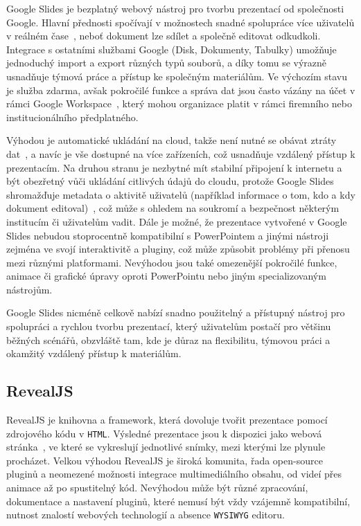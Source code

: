 Google Slides je bezplatný webový nástroj pro tvorbu prezentací od společnosti Google. 
Hlavní přednosti spočívají v možnostech snadné spolupráce více uživatelů v reálném čase~\cite{slides}, neboť dokument lze sdílet a společně editovat odkudkoli.
Integrace s ostatními službami Google (Disk, Dokumenty, Tabulky) umožňuje jednoduchý import a export různých typů souborů, a díky tomu se výrazně usnadňuje týmová práce a přístup ke společným materiálům. 
Ve výchozím stavu je služba zdarma, avšak pokročilé funkce a správa dat jsou často vázány na účet v rámci Google Workspace~\cite{slides}, který mohou organizace platit v rámci firemního nebo institucionálního předplatného. 

Výhodou je automatické ukládání na cloud, takže není nutné se obávat ztráty dat~\cite{slides}, a navíc je vše dostupné na více zařízeních, což usnadňuje vzdálený přístup k prezentacím. 
Na druhou stranu je nezbytné mít stabilní připojení k internetu a být obezřetný vůči ukládání citlivých údajů do cloudu, protože Google Slides shromažďuje metadata o aktivitě uživatelů (například informace o tom, kdo a kdy dokument editoval)~\cite{google_terms}, což může s ohledem na soukromí a bezpečnost některým institucím či uživatelům vadit. 
Dále je možné, že prezentace vytvořené v Google Slides nebudou stoprocentně kompatibilní s PowerPointem a jinými nástroji zejména ve svojí interaktivitě a pluginy, což může způsobit problémy při přenosu mezi různými platformami. 
Nevýhodou jsou také omezenější pokročilé funkce, animace či grafické úpravy oproti PowerPointu nebo jiným specializovaným nástrojům. 

Google Slides nicméně celkově nabízí snadno použitelný a přístupný nástroj pro spolupráci a rychlou tvorbu prezentací, který uživatelům postačí pro většinu běžných scénářů, obzvláště tam, kde je důraz na flexibilitu, týmovou práci a okamžitý vzdálený přístup k materiálům.


\subsection{RevealJS}\label{text:revealjs}

RevealJS je knihovna a framework, která dovoluje tvořit prezentace pomocí zdrojového kódu v \texttt{HTML}. 
Výsledné prezentace jsou k dispozici jako webová stránka~\cite{revealjs}, ve které se vykreslují jednotlivé snímky, mezi kterými lze plynule procházet. 
Velkou výhodou RevealJS je široká komunita, řada open-source pluginů a neomezené možnosti integrace multimediálního obsahu, od videí přes animace až po spustitelný kód. 
Nevýhodou může být různé zpracování, dokumentace a nastavení pluginů, které nemusí být vždy vzájemně kompatibilní, nutnost znalostí webových technologií a absence \texttt{WYSIWYG} editoru. 

